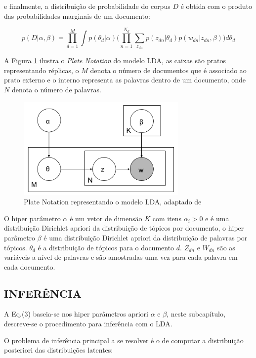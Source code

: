 \documentclass[12pt,a4paper]{article}
\begin{document}
e finalmente, a distribuição de probabilidade do corpus $D$ é obtida com o produto das probabilidades marginais de um documento:

\begin{equation}
p(D|\alpha,\beta)= \prod_{d=1}^{M} \int{p(\theta _d|\alpha)\Bigg(\prod_{n=1}^{N_d}\sum_{z_{dn}} p(z_{dn}|\theta _d)p(w_{dn}|z_{dn},\beta)\Bigg)d\theta _d}
\end{equation}


A Figura \ref{fig-plate} ilustra o 	\textit{Plate Notation} do modelo LDA, as caixas são pratos representando réplicas,
o $M$ denota o número de documentos que é associado ao prato externo e o interno representa as palavras dentro de um documento, onde $N$ denota o número de palavras.

\begin{figure}[H]
 \centering
   \includegraphics[height=5cm]{images/figure_1.png}
   \caption{Plate Notation representando o modelo LDA, adaptado de }
   \label{fig-plate}
\end{figure}

O hiper parâmetro $\alpha$ é um vetor de dimensão $K$ com itens \(\alpha _i>0\) e é uma distribuição Dirichlet apriori da distribuição de tópicos por documento,
o hiper parâmetro $\beta$ é uma distribuição Dirichlet apriori da distribuição de palavras por tópicos. $\theta _d$ é a distribuição de tópicos para o documento $d$. $Z_{dn}$ e $W_{dn}$ são as variáveis a nível de palavras e são amostradas uma vez para cada palavra em cada documento.


\subsection{INFERÊNCIA} \label{sec:inferencia}
A Eq.(3) baseia-se nos hiper parâmetros apriori $\alpha$ e $\beta$, neste subcapítulo, descreve-se o procedimento para inferência com o LDA.

O problema de inferência principal a se resolver é o de  computar a distribuição posteriori das distribuições latentes:
\end{document}
